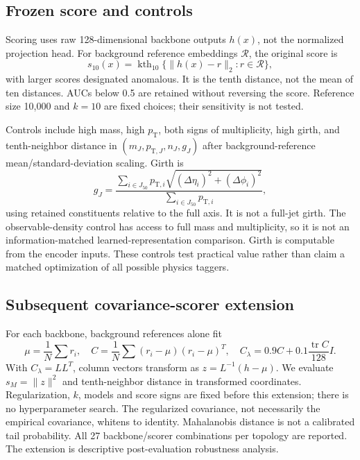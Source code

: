 \documentclass[11pt,a4paper]{article}
\newcommand{\pt}{p_{\mathrm T}}
\begin{document}
\subsection{Frozen score and controls}
Scoring uses raw 128-dimensional backbone outputs $h(x)$, not the normalized
projection head. For background reference embeddings $\mathcal R$, the original
score is
\begin{equation}s_{10}(x)=\operatorname{kth}_{10}\{\|h(x)-r\|_2:r\in\mathcal R\},\end{equation}
with larger scores designated anomalous. It is the tenth distance, not the mean
of ten distances. AUCs below 0.5 are retained without reversing the score.
Reference size 10,000 and $k=10$ are fixed choices; their sensitivity is not tested.

Controls include high mass, high $\pt$, both signs of multiplicity, high girth,
and tenth-neighbor distance in $(m_J,p_{\mathrm T,J},n_J,g_J)$ after background-reference
mean/standard-deviation scaling. Girth is
\begin{equation}
 g_J=\frac{\sum_{i\in J_{50}}p_{\mathrm T,i}\sqrt{(\Delta\eta_i)^2+(\Delta\phi_i)^2}}
 {\sum_{i\in J_{50}}p_{\mathrm T,i}},
\end{equation}
using retained constituents relative to the full axis. It is not a full-jet girth.
The observable-density control has access to full mass and multiplicity, so it is
not an information-matched learned-representation comparison. Girth is computable
from the encoder inputs. These controls test practical value rather than claim
a matched optimization of all possible physics taggers.

\subsection{Subsequent covariance-scorer extension}
For each backbone, background references alone fit
\begin{equation}
 \mu=\frac{1}{N}\sum r_i,\quad C=\frac{1}{N}\sum(r_i-\mu)(r_i-\mu)^T,\quad
 C_\lambda=0.9C+0.1\frac{\operatorname{tr}C}{128}I.
\end{equation}
With $C_\lambda=LL^T$, column vectors transform as $z=L^{-1}(h-\mu)$.
We evaluate $s_M=\|z\|^2$ and tenth-neighbor distance in transformed coordinates.
Regularization, $k$, models and score signs are fixed before this extension;
there is no hyperparameter search. The regularized covariance, not necessarily
the empirical covariance, whitens to identity. Mahalanobis distance is not a
calibrated tail probability. All 27 backbone/scorer combinations per topology
are reported. The extension is descriptive post-evaluation robustness analysis.
\end{document}
